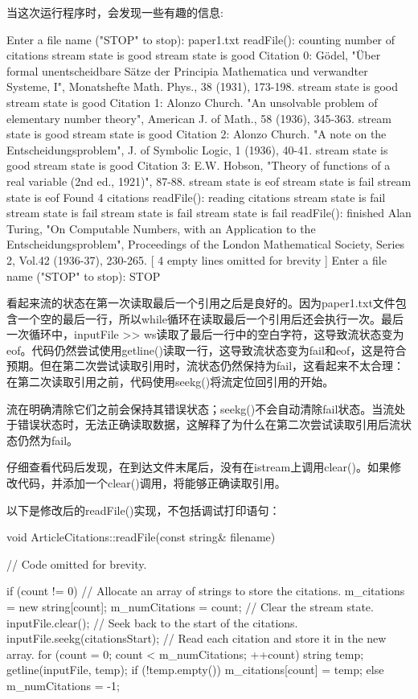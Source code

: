 当这次运行程序时，会发现一些有趣的信息:

\begin{shell}
Enter a file name ("STOP" to stop): paper1.txt
readFile(): counting number of citations
stream state is good
stream state is good
Citation 0: Gödel, "Über formal unentscheidbare Sätze der Principia Mathematica und
verwandter Systeme, I", Monatshefte Math. Phys., 38 (1931), 173-198.
stream state is good
stream state is good
Citation 1: Alonzo Church. "An unsolvable problem of elementary number theory",
American J. of Math., 58 (1936), 345-363.
stream state is good
stream state is good
Citation 2: Alonzo Church. "A note on the Entscheidungsproblem", J. of Symbolic
Logic, 1 (1936), 40-41.
stream state is good
stream state is good
Citation 3: E.W. Hobson, "Theory of functions of a real variable (2nd ed.,
1921)", 87-88.
stream state is eof
stream state is fail
stream state is eof
Found 4 citations
readFile(): reading citations
stream state is fail
stream state is fail
stream state is fail
stream state is fail
readFile(): finished
Alan Turing, "On Computable Numbers, with an Application to the
Entscheidungsproblem", Proceedings of the London Mathematical Society, Series 2,
Vol.42 (1936-37), 230-265.
[ 4 empty lines omitted for brevity ]
Enter a file name ("STOP" to stop): STOP
\end{shell}

看起来流的状态在第一次读取最后一个引用之后是良好的。因为paper1.txt文件包含一个空的最后一行，所以while循环在读取最后一个引用后还会执行一次。最后一次循环中，inputFile >{}> ws读取了最后一行中的空白字符，这导致流状态变为eof。代码仍然尝试使用getline()读取一行，这导致流状态变为fail和eof，这是符合预期。但在第二次尝试读取引用时，流状态仍然保持为fail，这看起来不太合理：在第二次读取引用之前，代码使用seekg()将流定位回引用的开始。

流在明确清除它们之前会保持其错误状态；seekg()不会自动清除fail状态。当流处于错误状态时，无法正确读取数据，这解释了为什么在第二次尝试读取引用后流状态仍然为fail。

仔细查看代码后发现，在到达文件末尾后，没有在istream上调用clear()。如果修改代码，并添加一个clear()调用，将能够正确读取引用。

以下是修改后的readFile()实现，不包括调试打印语句：

\begin{cpp}
void ArticleCitations::readFile(const string& filename)
{
    // Code omitted for brevity.

    if (count != 0) {
        // Allocate an array of strings to store the citations.
        m_citations = new string[count];
        m_numCitations = count;
        // Clear the stream state.
        inputFile.clear();
        // Seek back to the start of the citations.
        inputFile.seekg(citationsStart);
        // Read each citation and store it in the new array.
        for (count = 0; count < m_numCitations; ++count) {
            string temp;
            getline(inputFile, temp);
            if (!temp.empty()) {
                m_citations[count] = temp;
            }
        }
    } else {
        m_numCitations = -1;
    }
}
\end{cpp}

